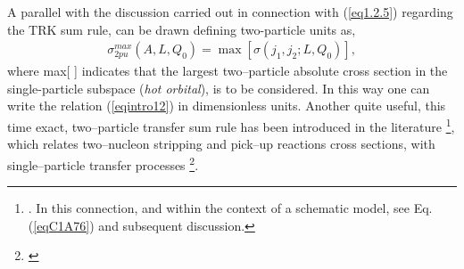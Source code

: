 




A parallel with the discussion carried out in connection with (\ref{eq1.2.5}) regarding the TRK sum rule, can be drawn defining two-particle units as,
\begin{align}
\sigma^{max}_{2pu}(A,L,Q_0)=\max \left[\sigma(j_1,j_2;L,Q_0)\right],
\end{align}
where max[ ] indicates that the largest two--particle absolute cross section in the single-particle subspace (\textit{hot orbital}), is to be considered. In this way one can write the relation (\ref{eqintro12}) in dimensionless units.  Another quite useful, this time exact, two--particle transfer sum rule has been introduced in the literature \footnote{\cite{Bayman:72}. In this connection, and within the context of a schematic model, see Eq. (\ref{eqC1A76}) and subsequent discussion.}, which relates two--nucleon stripping and pick--up reactions cross sections, with single--particle transfer processes \footnote{\cite{Lanford:77}}.


